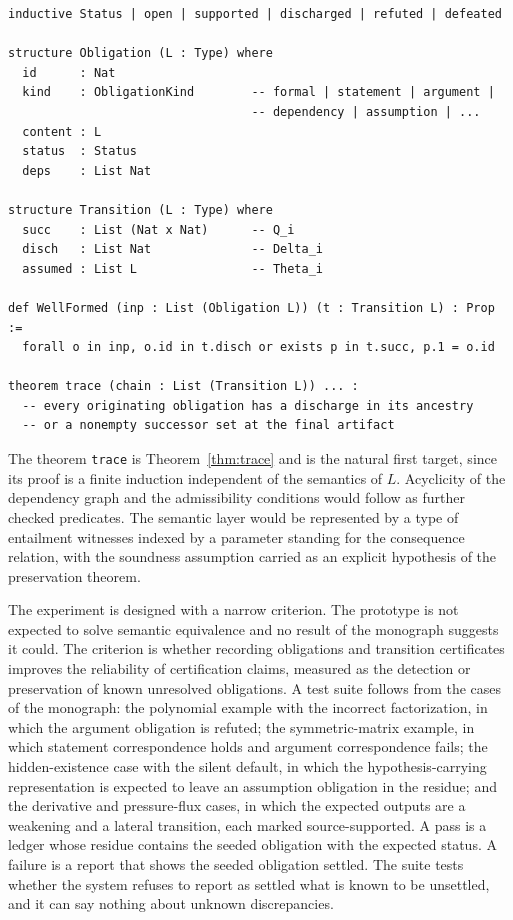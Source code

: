 \begin{verbatim}
inductive Status | open | supported | discharged | refuted | defeated

structure Obligation (L : Type) where
  id      : Nat
  kind    : ObligationKind        -- formal | statement | argument |
                                  -- dependency | assumption | ...
  content : L
  status  : Status
  deps    : List Nat

structure Transition (L : Type) where
  succ    : List (Nat x Nat)      -- Q_i
  disch   : List Nat              -- Delta_i
  assumed : List L                -- Theta_i

def WellFormed (inp : List (Obligation L)) (t : Transition L) : Prop :=
  forall o in inp, o.id in t.disch or exists p in t.succ, p.1 = o.id

theorem trace (chain : List (Transition L)) ... :
  -- every originating obligation has a discharge in its ancestry
  -- or a nonempty successor set at the final artifact
\end{verbatim}

The theorem \texttt{trace} is Theorem~\ref{thm:trace} and is the natural first target, since its proof is a finite induction independent of the semantics of $L$. Acyclicity of the dependency graph and the admissibility conditions would follow as further checked predicates. The semantic layer would be represented by a type of entailment witnesses indexed by a parameter standing for the consequence relation, with the soundness assumption carried as an explicit hypothesis of the preservation theorem.

The experiment is designed with a narrow criterion. The prototype is not expected to solve semantic equivalence and no result of the monograph suggests it could. The criterion is whether recording obligations and transition certificates improves the reliability of certification claims, measured as the detection or preservation of known unresolved obligations. A test suite follows from the cases of the monograph: the polynomial example with the incorrect factorization, in which the argument obligation is refuted; the symmetric-matrix example, in which statement correspondence holds and argument correspondence fails; the hidden-existence case with the silent default, in which the hypothesis-carrying representation is expected to leave an assumption obligation in the residue; and the derivative and pressure-flux cases, in which the expected outputs are a weakening and a lateral transition, each marked source-supported. A pass is a ledger whose residue contains the seeded obligation with the expected status. A failure is a report that shows the seeded obligation settled. The suite tests whether the system refuses to report as settled what is known to be unsettled, and it can say nothing about unknown discrepancies.

